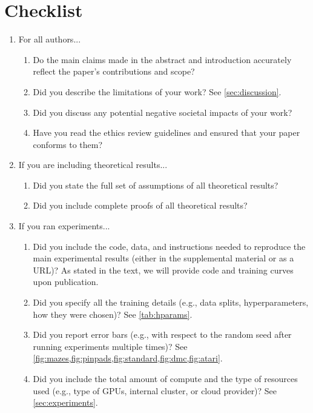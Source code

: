 \section*{Checklist}

\begin{enumerate}

\item For all authors...
\begin{enumerate}
  \item Do the main claims made in the abstract and introduction accurately reflect the paper's contributions and scope?
    \answerYes{}
  \item Did you describe the limitations of your work?
    \answerYes{} See \cref{sec:discussion}.
  \item Did you discuss any potential negative societal impacts of your work?
    \answerYes{}
  \item Have you read the ethics review guidelines and ensured that your paper conforms to them?
    \answerYes{}
\end{enumerate}

\item If you are including theoretical results...
\begin{enumerate}
  \item Did you state the full set of assumptions of all theoretical results?
    \answerNA{}
        \item Did you include complete proofs of all theoretical results?
    \answerNA{}
\end{enumerate}

\item If you ran experiments...
\begin{enumerate}
  \item Did you include the code, data, and instructions needed to reproduce the main experimental results (either in the supplemental material or as a URL)?
    \answerYes{} As stated in the text, we will provide code and training curves upon publication.
  \item Did you specify all the training details (e.g., data splits, hyperparameters, how they were chosen)?
    \answerYes{} See \cref{tab:hparams}.
        \item Did you report error bars (e.g., with respect to the random seed after running experiments multiple times)?
    \answerYes{} See \cref{fig:mazes,fig:pinpads,fig:standard,fig:dmc,fig:atari}.
        \item Did you include the total amount of compute and the type of resources used (e.g., type of GPUs, internal cluster, or cloud provider)?
    \answerYes{} See \cref{sec:experiments}.
\end{enumerate}


\end{enumerate}
